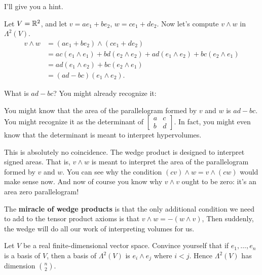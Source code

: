I'll give you a hint.
\begin{example}
	Let $V = \mathbb R^2$, and let $v = ae_1 + be_2$, $w = ce_1 + de_2$.
	Now let's compute $v \wedge w$ in $\Lambda^2(V)$.
	\begin{align*}
		v \wedge w &= (ae_1 + be_2) \wedge (ce_1 + de_2) \\
		&= ac (e_1 \wedge e_1) + bd (e_2 \wedge e_2)
		+ ad (e_1 \wedge e_2) + bc (e_2 \wedge e_1) \\
		&= ad (e_1 \wedge e_2) + bc (e_2 \wedge e_1) \\
		&= (ad-bc) (e_1 \wedge e_2).
	\end{align*}
\end{example}

What is $ad-bc$? You might already recognize it:
\begin{itemize}
	\ii  You might know that the area of the parallelogram formed by $v$ and $w$ is $ad-bc$.
	\ii You might recognize it as the determinant of
	$ \begin{bmatrix} a & c \\ b & d \end{bmatrix}$.
	In fact, you might even know that the determinant
	is meant to interpret hypervolumes.
\end{itemize}
This is absolutely no coincidence.
The wedge product is designed to interpret signed areas.
That is, $v \wedge w$ is meant to interpret the area of the parallelogram
formed by $v$ and $w$.
You can see why the condition $(cv) \wedge w = v \wedge (cw)$ would make sense now.
And now of course you know why $v \wedge v$ ought to be zero:
it's an area zero parallelogram!

The \textbf{miracle of wedge products} is that the only additional condition
we need to add to the tensor product axioms is that $v \wedge w = -(w \wedge v)$,
Then suddenly, the wedge will do all our work of interpreting volumes for us.

\begin{ques}
	Let $V$ be a real finite-dimensional vector space.
	Convince yourself that if $e_1, \dots, e_n$ is a basis of $V$,
	then a basis of $\Lambda^2(V)$ is $e_i \wedge e_j$ where $i < j$.
	Hence $\Lambda^2(V)$ has dimension $\binom n2$.
\end{ques}

